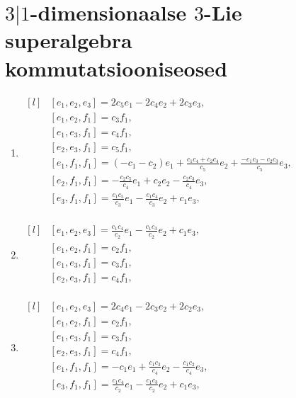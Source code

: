 
\appendix
\section{\texorpdfstring{$3|1$}{3|1}-dimensionaalse
    \texorpdfstring{$3$}{3}-Lie superalgebra kommutatsiooniseosed
}\label{lisa:3|1 kommutatsiooniseosed}

\begin{enumerate}
    \item $\begin{matrix*}[l]
            & [e_1, e_2, e_3] = 2 c_{5} e_1 - 2 c_{4} e_2 + 2 c_{3} e_3, \\
            & [e_1, e_2, f_1] = c_{3} f_1, \\
            & [e_1, e_3, f_1] = c_{4} f_1, \\
            & [e_2, e_3, f_1] = c_{5} f_1, \\
            & [e_1, f_1, f_1] = \left(-c_{1} - c_{2}\right) e_1 + \frac{c_{1} c_{4} + c_{2} c_{4}}{c_{5}} e_2 + \frac{-c_{1} c_{3} - c_{2} c_{3}}{c_{5}} e_3, \\
            & [e_2, f_1, f_1] = -\frac{c_{2} c_{5}}{c_{4}} e_1 + c_{2} e_2 - \frac{c_{2} c_{3}}{c_{4}} e_3, \\
            & [e_3, f_1, f_1] = \frac{c_{1} c_{5}}{c_{3}} e_1 - \frac{c_{1} c_{4}}{c_{3}} e_2 + c_{1} e_3, \\
        \end{matrix*}$

    \item $\begin{matrix*}[l]
            & [e_1, e_2, e_3] = \frac{c_{1} c_{4}}{c_{2}} e_1 - \frac{c_{1} c_{3}}{c_{2}} e_2 + c_{1} e_3, \\
            & [e_1, e_2, f_1] = c_{2} f_1, \\
            & [e_1, e_3, f_1] = c_{3} f_1, \\
            & [e_2, e_3, f_1] = c_{4} f_1, \\
        \end{matrix*}$

    \item $\begin{matrix*}[l]
            & [e_1, e_2, e_3] = 2 c_{4} e_1 - 2 c_{3} e_2 + 2 c_{2} e_3, \\
            & [e_1, e_2, f_1] = c_{2} f_1, \\
            & [e_1, e_3, f_1] = c_{3} f_1, \\
            & [e_2, e_3, f_1] = c_{4} f_1, \\
            & [e_1, f_1, f_1] = -c_{1} e_1 + \frac{c_{1} c_{3}}{c_{4}} e_2 - \frac{c_{1} c_{2}}{c_{4}} e_3, \\
            & [e_3, f_1, f_1] = \frac{c_{1} c_{4}}{c_{2}} e_1 - \frac{c_{1} c_{3}}{c_{2}} e_2 + c_{1} e_3, \\
        \end{matrix*}$


\end{enumerate}
